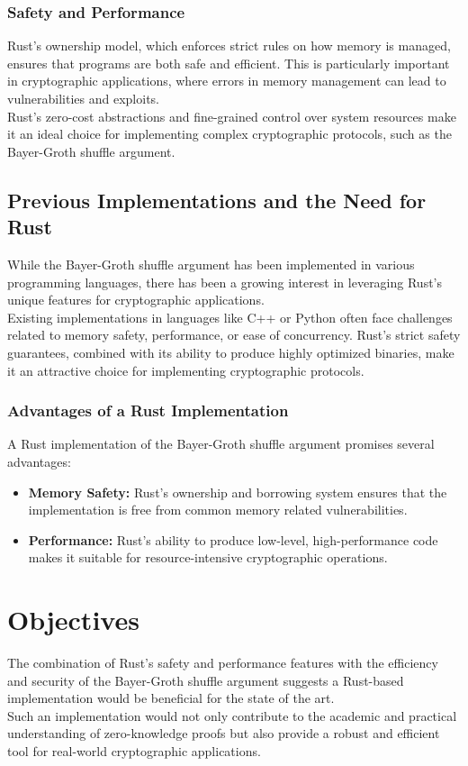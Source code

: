 \documentclass[12pt,a4paper]{report}
\begin{document}
\subsubsection{Safety and Performance}
Rust's ownership model, which enforces strict rules on how memory is managed, ensures that programs
are both safe and efficient\cite{rust}. This is particularly important in cryptographic applications,
where errors in memory management can lead to vulnerabilities and exploits.\\
Rust's zero-cost abstractions and fine-grained control over system resources make it an ideal
choice for implementing complex cryptographic protocols, such as the Bayer-Groth shuffle argument.
\subsection{Previous Implementations and the Need for Rust}
While the Bayer-Groth shuffle argument has been implemented in various programming languages, 
there has been a growing interest in leveraging Rust’s unique features for cryptographic applications. \\
Existing implementations in languages like C++ or Python often face challenges related to memory safety, performance, or ease of concurrency. 
Rust’s strict safety guarantees, combined with its ability to produce highly optimized binaries, make it an attractive choice for implementing cryptographic protocols.

\subsubsection{Advantages of a Rust Implementation}
A Rust implementation of the Bayer-Groth shuffle argument promises several advantages:
\begin{itemize}
    \item \textbf{Memory Safety:} Rust's ownership and borrowing system ensures that the implementation is free from common memory related vulnerabilities.
     \item \textbf{Performance:} Rust’s ability to produce low-level, high-performance code makes it suitable for resource-intensive cryptographic operations.
\end{itemize}

\section{Objectives}
The combination of Rust's safety and performance features with the efficiency and security of the Bayer-Groth shuffle argument
suggests a Rust-based implementation would be beneficial for the state of the art.
\\Such an implementation would not only contribute to the academic and practical understanding of
zero-knowledge proofs but also provide a robust and efficient tool for real-world cryptographic applications.
\end{document}
